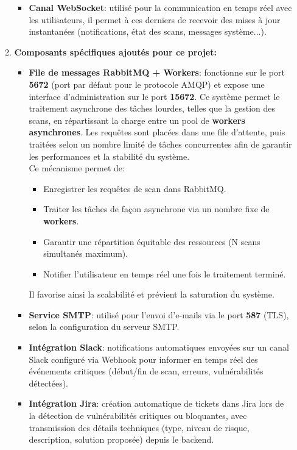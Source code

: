 \begin{itemize}[label=$-$]
\begin{enumerate}[left=-0.03cm]
\begin{itemize}[label=$\bullet$, left=-0.08cm]
                \item \textbf{Canal WebSocket}: utilisé pour la communication en temps réel avec les utilisateurs, il permet à ces derniers de recevoir des mises à jour instantanées (notifications, état des scans, messages système...).
            \end{itemize}
        \item \textbf{Composants spécifiques ajoutés pour ce projet:}
            \begin{itemize}[label=$\bullet$, left=-0.08cm]
                \item \textbf{File de messages RabbitMQ + Workers}: fonctionne sur le port \textbf{5672} (port par défaut pour le protocole \acs{AMQP}) et expose une interface d’administration sur le port \textbf{15672}. Ce système permet le traitement asynchrone des tâches lourdes, telles que la gestion des scans, en répartissant la charge entre un pool de \textbf{workers asynchrones}. Les requêtes sont placées dans une file d’attente, puis traitées selon un nombre limité de tâches concurrentes afin de garantir les performances et la stabilité du système.\\
                Ce mécanisme permet de:
                \begin{itemize}[label=$\circ$]
                    \item Enregistrer les requêtes de scan dans RabbitMQ.
                    \item Traiter les tâches de façon asynchrone via un nombre fixe de \textbf{workers}.
                    \item Garantir une répartition équitable des ressources (N scans simultanés maximum).
                    \item Notifier l’utilisateur en temps réel une fois le traitement terminé.
                \end{itemize}
                Il favorise ainsi la scalabilité et prévient la saturation du système.
                \item \textbf{Service \acs{SMTP}}: utilisé pour l’envoi d’e-mails via le port \textbf{587} (TLS), selon la configuration du serveur SMTP.
                \item \textbf{Intégration \acs{Slack}}: notifications automatiques envoyées sur un canal Slack configuré via Webhook pour informer en temps réel des événements critiques (début/fin de scan, erreurs, vulnérabilités détectées).
                \item \textbf{Intégration Jira}: création automatique de tickets dans Jira lors de la détection de vulnérabilités critiques ou bloquantes, avec transmission des détails techniques (type, niveau de risque, description, solution proposée) depuis le backend.

\end{itemize}
\end{enumerate}
\end{itemize}

